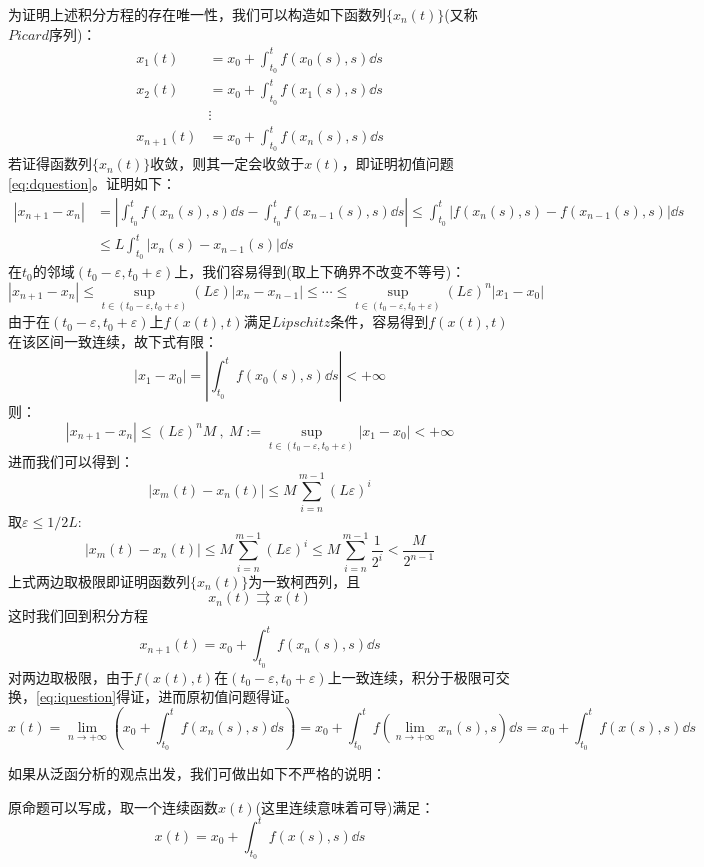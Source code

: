 为证明上述积分方程的存在唯一性，我们可以构造如下函数列$\{x_n(t)\}$(又称$Picard$序列)：
\[\begin{aligned}
x_1(t)&=x_0+\int_{t_0}^tf(x_0(s),s)\dd s\\
x_2(t)&=x_0+\int_{t_0}^tf(x_1(s),s)\dd s\\
&\vdots \\
x_{n+1}(t)&=x_0+\int_{t_0}^tf(x_n(s),s)\dd s
\end{aligned}\]
若证得函数列$\{x_n(t)\}$收敛，则其一定会收敛于$x(t)$，即证明初值问题\eqref{eq:dquestion}。证明如下：
\begin{equation*}
    \begin{aligned}
        |x_{n+1}-x_n| & =\left|\int_{t_0}^tf(x_n(s),s)\dd s-\int_{t_0}^tf(x_{n-1}(s),s)\dd s\right| \leq \int_{t_0}^t \left| f(x_n(s),s)-f(x_{n-1}(s),s) \right| \dd s \\
        & \leq L\int_{t_0}^t \left| x_n(s)-x_{n-1}(s) \right| \dd s
    \end{aligned}
\end{equation*}
在$t_0$的邻域$(t_0-\varepsilon,t_0+\varepsilon)$上，我们容易得到(取上下确界不改变不等号)：
\[|x_{n+1}-x_n| \leq {\mathop {\text{sup}}\limits_{t \in (t_0-\varepsilon,t_0+\varepsilon)}} (L\varepsilon)|x_{n}-x_{n-1}| \leq \cdots \leq {\mathop {\text{sup}}\limits_{t \in (t_0-\varepsilon,t_0+\varepsilon)}} (L\varepsilon)^n|x_1-x_0|\]
由于在$(t_0-\varepsilon,t_0+\varepsilon)$上$f(x(t),t)$满足$Lipschitz$条件，容易得到$f(x(t),t)$在该区间一致连续，故下式有限：
\[|x_1-x_0|=|\int_{t_0}^tf(x_0(s),s)\dd s|<+\infty\]
则：
\[|x_{n+1}-x_n| \leq (L\varepsilon)^nM \ , \ M:={\mathop {\text{sup}}\limits_{t \in (t_0-\varepsilon,t_0+\varepsilon)}} |x_1-x_0| <+\infty\]
进而我们可以得到：
\[|x_m(t)-x_n(t)| \leq M\sum_{i=n}^{m-1}(L\varepsilon)^i\]
取$\varepsilon \leq 1/2L$:
\[|x_m(t)-x_n(t)| \leq M\sum_{i=n}^{m-1}(L\varepsilon)^i \leq M\sum_{i=n}^{m-1}\frac{1}{2^i} < \frac{M}{2^{n-1}}\]
上式两边取极限即证明函数列$\{x_n(t)\}$为一致柯西列，且
\[x_n(t) \rightrightarrows x(t)\]
这时我们回到积分方程
\[x_{n+1}(t)=x_0+\int_{t_0}^tf(x_n(s),s)\dd s\]
对两边取极限，由于$f(x(t),t)$在$(t_0-\varepsilon,t_0+\varepsilon)$上一致连续，积分于极限可交换，\eqref{eq:iquestion}得证，进而原初值问题得证。
\[x(t)=\lim_{n \rightarrow +\infty}\left(x_0+\int_{t_0}^tf(x_n(s),s)\dd s\right)=x_0+\int_{t_0}^tf \left (\lim_{n \rightarrow +\infty}x_n(s),s \right )\dd s=x_0+\int_{t_0}^tf(x(s),s)\dd s\]

如果从泛函分析的观点出发，我们可做出如下不严格的说明：

原命题可以写成，取一个连续函数$x(t)$(这里连续意味着可导)满足：
\[x(t)=x_0+\int_{t_0}^tf(x(s),s)\dd s\]

